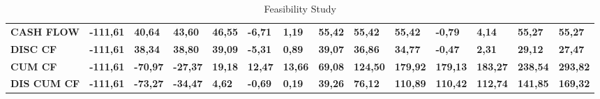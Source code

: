 {\begin{table}[]
{\begin{tabular}{| l | l | l | l | l | l | l | l | l | l | l | l | l | l |}
\rowcolor[gray]{0.85}
\textbf{CASH FLOW}                                                            & \textbf{-111,61} & \textbf{40,64}  & \textbf{43,60}  & \textbf{46,55}  & \textbf{-6,71}  & \textbf{1,19}   & \textbf{55,42}  & \textbf{55,42}  & \textbf{55,42}  & \textbf{-0,79}  & \textbf{4,14}    & \textbf{55,27}   & \textbf{55,27}   \\
\rowcolor[gray]{0.85}
\textbf{DISC CF}                                                              & \textbf{-111,61} & \textbf{38,34}  & \textbf{38,80}  & \textbf{39,09}  & \textbf{-5,31}  & \textbf{0,89}   & \textbf{39,07}  & \textbf{36,86}  & \textbf{34,77}  & \textbf{-0,47}  & \textbf{2,31}    & \textbf{29,12}   & \textbf{27,47}   \\
\rowcolor[gray]{0.85}
\textbf{CUM CF}                                                               & \textbf{-111,61} & \textbf{-70,97} & \textbf{-27,37} & \textbf{19,18}  & \textbf{12,47}  & \textbf{13,66}  & \textbf{69,08}  & \textbf{124,50} & \textbf{179,92} & \textbf{179,13} & \textbf{183,27}  & \textbf{238,54}  & \textbf{293,82}  \\
\rowcolor[gray]{0.85}
\textbf{DIS CUM CF}                                                           & \textbf{-111,61} & \textbf{-73,27} & \textbf{-34,47} & \textbf{4,62}   & \textbf{-0,69}  & \textbf{0,19}   & \textbf{39,26}  & \textbf{76,12}  & \textbf{110,89} & \textbf{110,42} & \textbf{112,74}  & \textbf{141,85}  & \textbf{169,32} 
\\ \hline
\end{tabular}
}
\vspace*{\fill}
\caption{Feasibility Study}
\label{Feasibility Study}
\end{table}
}